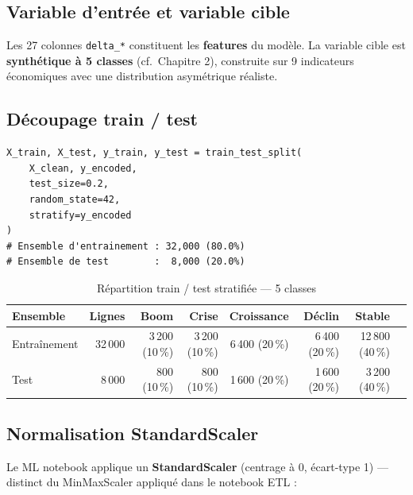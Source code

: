 \documentclass[12pt,a4paper,oneside]{report}
\newcommand{\code}[1]{\texttt{\small #1}}
\begin{document}
\subsection{Variable d'entrée et variable cible}

Les 27 colonnes \code{delta\_*} constituent les \textbf{features} du modèle. La variable cible est \textbf{synthétique à 5 classes} (cf.\ Chapitre 2), construite sur 9 indicateurs économiques avec une distribution asymétrique réaliste.

\subsection{Découpage train / test}

\begin{lstlisting}[caption={Division train/test stratifiée — ML notebook étape 2}]
X_train, X_test, y_train, y_test = train_test_split(
    X_clean, y_encoded,
    test_size=0.2,
    random_state=42,
    stratify=y_encoded
)
# Ensemble d'entrainement : 32,000 (80.0%)
# Ensemble de test        :  8,000 (20.0%)
\end{lstlisting}

\begin{table}[H]
  \centering
  \caption{Répartition train / test stratifiée — 5 classes}
  \label{tab:split}
  \small\setlength{\tabcolsep}{5pt}
  \begin{tabularx}{\textwidth}{lrrrrrrX}
    \toprule
    \textbf{Ensemble} & \textbf{Lignes} & \textbf{Boom} & \textbf{Crise} & \textbf{Croissance} & \textbf{Déclin} & \textbf{Stable} & \\
    \midrule
    Entraînement & 32\,000 & 3\,200 (10\,\%) & 3\,200 (10\,\%) & 6\,400 (20\,\%) & 6\,400 (20\,\%) & 12\,800 (40\,\%) & \\
    Test         & 8\,000  & 800 (10\,\%)   & 800 (10\,\%)   & 1\,600 (20\,\%) & 1\,600 (20\,\%) & 3\,200 (40\,\%)  & \\
    \bottomrule
  \end{tabularx}
  \normalsize
\end{table}

\subsection{Normalisation StandardScaler}

Le ML notebook applique un \textbf{StandardScaler} (centrage à 0, écart-type 1) — distinct du MinMaxScaler appliqué dans le notebook ETL :
\end{document}
